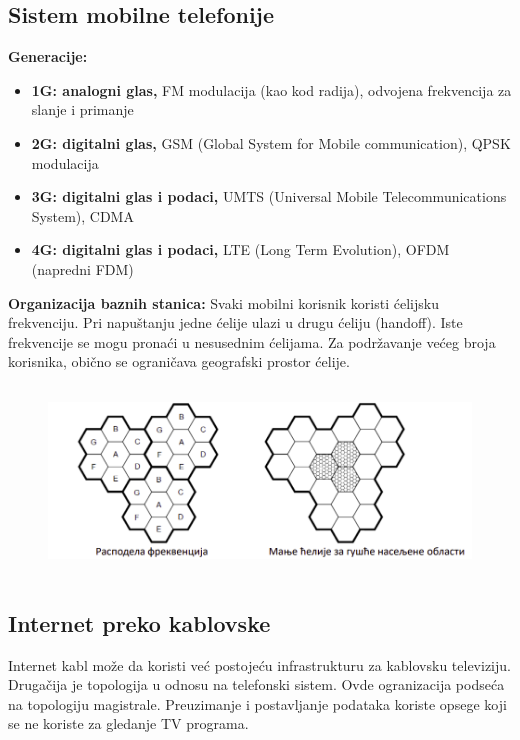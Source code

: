 \documentclass[a4paper]{article}
\begin{document}
    \subsection{Sistem mobilne telefonije}
        \noindent \textbf{Generacije:}
        \begin{itemize}
            \item \textbf{1G: analogni glas,} FM modulacija (kao kod radija), odvojena frekvencija 
                  za slanje i primanje 
            \item \textbf{2G: digitalni glas,} GSM (Global System for Mobile communication), 
                  QPSK modulacija
            \item \textbf{3G: digitalni glas i podaci,} UMTS (Universal Mobile Telecommunications System),
                  CDMA 
            \item \textbf{4G: digitalni glas i podaci,} LTE (Long Term Evolution), OFDM (napredni FDM)
        \end{itemize}
        \textbf{Organizacija baznih stanica:} Svaki mobilni korisnik koristi ćelijsku frekvenciju.
        Pri napuštanju jedne ćelije ulazi u drugu ćeliju (handoff). Iste frekvencije se mogu pronaći
        u nesusednim ćelijama. Za podržavanje većeg broja korisnika, obično se ograničava geografski
        prostor ćelije.
        \begin{figure}[H]
            \begin{center}
                \includegraphics[width=120mm,height=50mm]{Slike/mobilne_celije.png}
            \end{center}
        \end{figure}
    \subsection{Internet preko kablovske}
        Internet kabl može da koristi već postojeću infrastrukturu za kablovsku televiziju.
        Drugačija je topologija u odnosu na telefonski sistem. Ovde ogranizacija podseća
        na topologiju magistrale. Preuzimanje i postavljanje podataka koriste opsege koji
        se ne koriste za gledanje TV programa.
\end{document}
